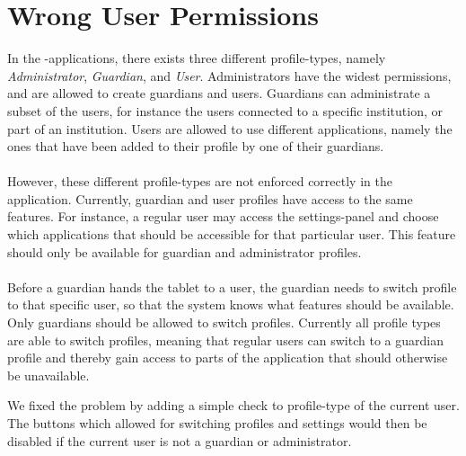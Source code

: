 \section{Wrong User Permissions}
\label{sec:wrong_user_permissions}

In the \giraf-applications, there exists three different profile-types, namely \emph{Administrator}, \emph{Guardian}, and \emph{User}. Administrators have the widest permissions, and are allowed to create guardians and users. Guardians can administrate a subset of the users, for instance the users connected to a specific institution, or part of an institution. Users are allowed to use different applications, namely the ones that have been added to their profile by one of their guardians. 
\\\\
However, these different profile-types are not enforced correctly in the \launcher application. Currently, guardian and user profiles have access to the same features. For instance, a regular user may access the settings-panel and choose which applications that should be accessible for that particular user. This feature should only be available for guardian and administrator profiles.
\\\\
Before a guardian hands the tablet to a user, the guardian needs to switch profile to that specific user, so that the system knows what features should be available. Only guardians should be allowed to switch profiles. Currently all profile types are able to switch profiles, meaning that regular users can switch to a guardian profile and thereby gain access to parts of the application that should otherwise be unavailable.

We fixed the problem by adding a simple check to profile-type of the current user. The buttons which allowed for switching profiles and settings would then be disabled if the current user is not a guardian or administrator.